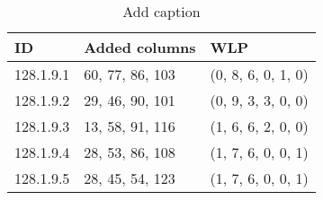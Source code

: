 \begin{table}[htbp]
  \centering
  \caption{Add caption}
    \begin{tabular}{lll}
    \textbf{ID} & \textbf{Added columns} & \textbf{WLP} \\
    \midrule
    128.1.9.1 & 60, 77, 86, 103 & (0, 8, 6, 0, 1, 0) \\
    128.1.9.2 & 29, 46, 90, 101 & (0, 9, 3, 3, 0, 0) \\
    128.1.9.3 & 13, 58, 91, 116 & (1, 6, 6, 2, 0, 0) \\
    128.1.9.4 & 28, 53, 86, 108 & (1, 7, 6, 0, 0, 1) \\
    128.1.9.5 & 28, 45, 54, 123 & (1, 7, 6, 0, 0, 1) \\
    \bottomrule
    \end{tabular}%
  \label{tab:addlabel}%
\end{table}%
